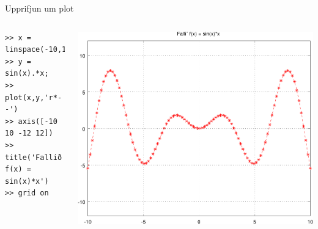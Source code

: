 \documentclass{beamer}
\begin{document}
\begin{frame}[fragile]{Upprifjun um plot}
\begin{columns}
\begin{verbatim}
>> x = linspace(-10,10);
>> y = sin(x).*x;
>> plot(x,y,'r*--')
>> axis([-10 10 -12 12])
>> title('Fallið f(x) = sin(x)*x')
>> grid on
\end{verbatim}
\includegraphics[width=\linewidth]{Pics/sintimesx}
\end{columns}
\end{frame}
\end{document}
